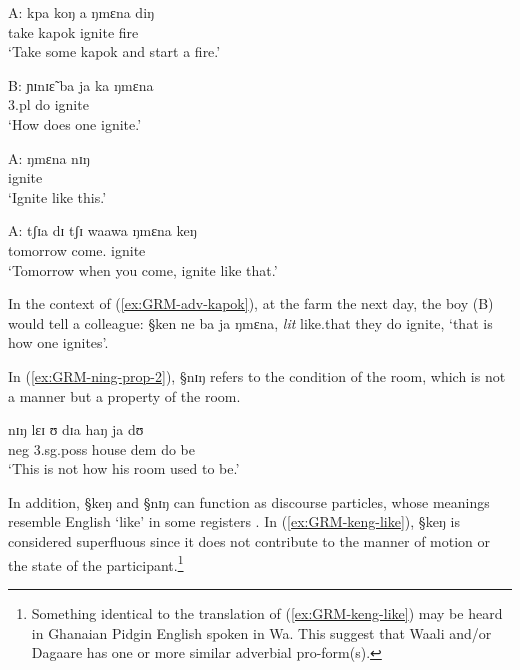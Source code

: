 \begin{exe}
\ex\label{ex:GRM-adv-kapok}
 \begin{xlist}
 
 \ex\label{ex:GRM-adv-kapok-A-1}
\gll A: kpa koŋ a ŋmɛna diŋ\\
{}  take kapok {\conn} ignite fire\\
\glt `Take some kapok and start a fire.'

 \ex\label{ex:GRM-adv-kapok-B}
\gll B:  ɲɪnɪɛ̃ ba ja ka ŋmɛna\\
{} {\q} {\sc 3.pl} do {\egr} ignite\\
\glt `How does one ignite.' 

 \ex\label{ex:GRM-adv-kapok-A-2}
\gll  A: ŋmɛna nɪŋ\\
{} ignite {\advm}\\
\glt `Ignite like this.'

 \ex\label{ex:GRM-adv-kapok-A-3}
 \gll  A: tʃɪa dɪ tʃɪ waawa ŋmɛna keŋ\\
{} tomorrow {\conn} {\cras} come.{\pfv} ignite {\advm}\\
\glt `Tomorrow when you come, ignite like that.'
 \end{xlist}
\end{exe}  
 
In the context of (\ref{ex:GRM-adv-kapok}), at the farm the next day, the boy
(B) would tell a colleague: {\S ken ne ba ja ŋmɛna},  {\it lit} like.that they
do ignite, `that is how one ignites'. 

In (\ref{ex:GRM-ning-prop-2}), {\S nɪŋ} refers to the condition of  the room,
which is not a manner  but a property of the room. 


\begin{exe}
\ex\label{ex:GRM-ning-prop-2}
 \gll nɪŋ lɛɪ ʊ dɪa haŋ ja dʊ\\
 {\advm} {\sc neg}  {\sc 3.sg.poss} house {\sc dem} do be\\
\glt  `This is not how his room used to be.'

\end{exe}

In addition, {\S keŋ} and {\S nɪŋ} can function as  discourse particles, whose
meanings resemble   English `like' in some registers \citep{Muff02}. In
(\ref{ex:GRM-keng-like}), {\S keŋ} is considered superfluous since it does not
contribute to the manner of  motion or the state of the
participant.\footnote{Something identical to the translation of
(\ref{ex:GRM-keng-like}) may be heard in  Ghanaian Pidgin English spoken in Wa.
This suggest that Waali and/or Dagaare has one or more similar adverbial
pro-form(s).} 

